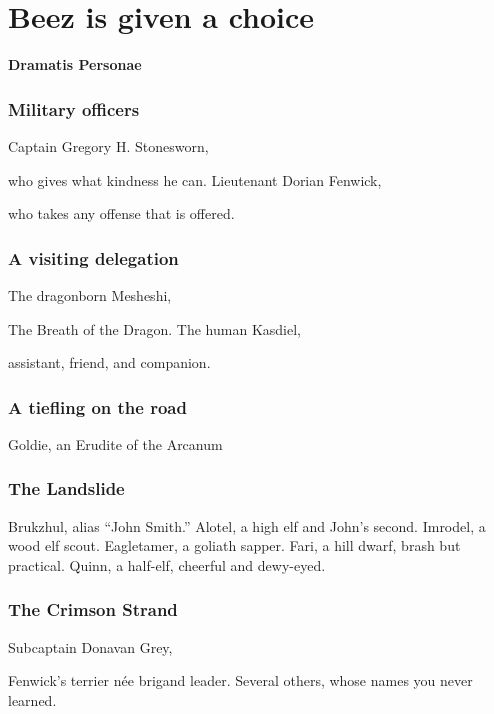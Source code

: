 \section{Beez is given a choice}
\textbf{\LARGE Dramatis Personae}
\begin{multicols}{2}


\subsubsection{Military officers}
Captain Gregory H. Stonesworn,\par who gives what kindness he can. \newline
Lieutenant Dorian Fenwick,\par who takes any offense that is offered.

\subsubsection{A visiting delegation}
The dragonborn Mesheshi,\par The Breath of the Dragon. \newline
The human Kasdiel,\par assistant, friend, and companion. \newline

\subsubsection{A tiefling on the road}
Goldie, an Erudite of the Arcanum

\newcolumn

\subsubsection{The Landslide}
Brukzhul, alias ``John Smith.'' \newline
Alotel, a high elf and John's second. \newline
Imrodel, a wood elf scout. \newline
Eagletamer, a goliath sapper. \newline
Fari, a hill dwarf, brash but practical. \newline
Quinn, a half-elf, cheerful and dewy-eyed. \newline

\subsubsection{The Crimson Strand}
Subcaptain Donavan Grey,\par Fenwick's terrier n\'ee brigand leader. \newline
Several others, whose names you never learned.
\end{multicols}
\noindent
\hrulefill

